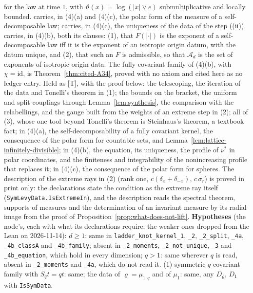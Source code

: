 \begin{proposition}
{for the law at time $1$, with $\vartheta(x) = \log(|x| \vee e)$ submultiplicative and locally bounded.
 carries, in (4)(a) and (4)(c), the polar form of the \Levy{} measure of a
self-decomposable law;  carries, in (4)(c), the uniqueness of the data of the step ((ii)).
 carries, in (4)(b), both its clauses: (1), that $F(|\cdot|)$ is the exponent of a
self-decomposable law iff it is the exponent of an isotropic origin datum, with the datum unique,
and (2), that such an $F$ is admissible, so that $\mathcal{A}_d$ is the set of exponents of
isotropic origin data. The fully covariant family of (4)(b), with $\chi = \mathrm{id}$, is
Theorem~\ref{thm:cited-A34}, proved with no axiom and cited here as no ledger entry.
Held as [T], with the proof below: the telescoping, the iteration of the data and Tonelli's theorem
in (1); the bounds on the bracket, the uniform and split couplings through
Lemma~\ref{lem:synthesis}, the comparison with the relabellings, and the gauge built from the
weights of an extreme step in (2); all of (3), whose one
tool beyond Tonelli's theorem is Steinhaus's theorem, a textbook fact; in (4)(a), the
self-decomposability of a fully covariant kernel, the consequence of the polar form for countable
sets, and Lemma~\ref{lem:lattice-infinitely-divisible}; in (4)(b), the equation, its uniqueness,
the profile of $\nu^*$ in polar coordinates, and the finiteness and integrability of the
nonincreasing profile that replaces it; in (4)(c), the consequence of the polar form for spheres.
The description of the extreme rays in (2) (rank one, $c(\delta_x + \delta_{-x})$, $c\,\sigma_r$)
is proved in print only: the declarations state the condition as the extreme ray itself
(\texttt{SymLevyData.IsExtremeIn}), and the description reads the spectral theorem, supports of
measures and the determination of an invariant measure by its radial image from the proof of
Proposition~\ref{prop:what-does-not-lift}.
\textbf{Hypotheses} (the node's, each with what its
declarations require; the weaker ones dropped from the Lean on 2026-11-14): $d \ge 1$: same in
\texttt{ladder\_knot\_kernel\_1}, \texttt{\_2}, \texttt{\_2\_split}, \texttt{\_4a},
\texttt{\_4b\_classA} and \texttt{\_4b\_family}; absent in \texttt{\_2\_moments},
\texttt{\_2\_not\_unique}, \texttt{\_3} and \texttt{\_4b\_equation}, which hold in every dimension;
$q > 1$: same wherever $q$ is read, absent in \texttt{\_2\_moments} and \texttt{\_4a}, which do
not read it. (1) symmetric $q$-covariant family with $S_qt = qt$: same; the data of
$\varrho = \mu_{1,q}$ and of $\mu_1$: same, any $D_\varrho$, $D_1$ with \texttt{IsSymData}.
}
\end{proposition}
